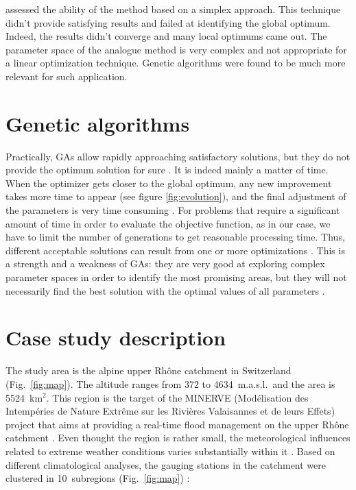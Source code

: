 \documentclass{ametsoc}
\begin{document}
\citet{Horton2012a} assessed the ability of the \citet{Nelder1965a} method based on a simplex approach. This technique didn't provide satisfying results and failed at identifying the global optimum. Indeed, the results didn't converge and many local optimums came out. The parameter space of the analogue method is very complex and not appropriate for a linear optimization technique. Genetic algorithms were found to be much more relevant for such application.

\section{Genetic algorithms}



Practically, GAs allow rapidly approaching satisfactory solutions, but they do not provide the optimum solution for sure \citep{Zitzler2004a}. It is indeed mainly a matter of time. When the optimizer gets closer to the global optimum, any new improvement takes more time to appear (see figure \ref{fig:evolution}), and the final adjustment of the parameters is very time consuming \citep{Back1993a}. For problems that require a significant amount of time in order to evaluate the objective function, as in our case, we have to limit the number of generations to get reasonable processing time. Thus, different acceptable solutions can result from one or more optimizations \citep{Holland1992b}. This is a strength and a weakness of GAs: they are very good at exploring complex parameter spaces in order to identify the most promising areas, but they will not necessarily find the best solution with the optimal values of all parameters \citep{Holland1992b}.







\section{Case study description}

The study area is the alpine upper Rh\^{o}ne catchment in Switzerland (Fig.\ \ref{fig:map}). The altitude ranges from 372 to 4634~m.a.s.l.\ and the area is 5524~km$^{2}$. This region is the target of the MINERVE (Mod\'{e}lisation des Intemp\'{e}ries de Nature Extr\^{e}me sur les Rivi\`{e}res Valaisannes et de leurs Effets) project that aims at providing a real-time flood management on the upper Rh\^{o}ne catchment \citep{GarciaHernandez2009b}. Even thought the region is rather small, the meteorological influences related to extreme weather conditions varies substantially within it \citep[see][]{Horton2012}. Based on different climatological analyses, the gauging stations in the catchment were clustered in 10~subregions (Fig.\ \ref{fig:map}) :
\end{document}
